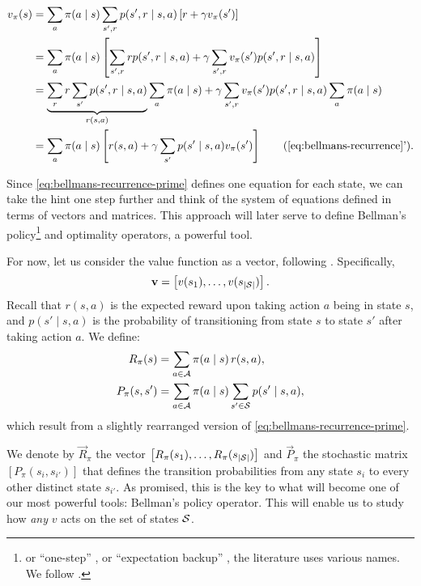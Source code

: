 \begin{align}
\label{eq:bellmans-recurrence-prime}
v_\pi(s) &= \sum_{a} \pi(a \mid s) \sum_{s', r} p(s', r \mid s, a) \left[ r + \gamma v_\pi (s') \right] \nonumber \\
&= \sum_{a} \pi(a \mid s) \left[ \sum_{s', r} r p(s', r \mid s, a) + \gamma \sum_{s', r} v_\pi (s') p(s', r \mid s,a) \right] \nonumber \\
&= \underbrace{\sum_{r} r \sum_{s'} p(s', r \mid s, a)}_{r(s,a)} \sum_a \pi(a \mid s) + \gamma \sum_{s', r} v_\pi (s') p(s', r \mid s, a) \sum_{a} \pi(a \mid s) \nonumber \\
&= \sum_{a} \pi(a \mid s) \left[ r(s,a) + \gamma \sum_{s'} p(s' \mid s, a) v_\pi (s') \right] \tag{\ref{eq:bellmans-recurrence}'}.
\end{align}

Since \eqref{eq:bellmans-recurrence-prime} defines one equation for each state,
we can take the hint one step further and think of the system of equations
defined in terms of vectors and matrices. This approach will later serve to
define Bellman's policy\footnote{or ``one-step'' \cite[pg.~9]{nadeemward2021},
or ``expectation backup'' \cite[Lect.~3, Contraction Mapping]{silver2015}, the
literature uses various names. We follow
\cite{rao2022}.} and optimality operators, a powerful tool.

For now, let us consider the value function as a vector, following
\cite[pg.~132]{raoRL4F}. Specifically,
\begin{equation*}
    \mathbf{v} = \left[ v (s_1), \dots , v (s_{|\mathcal{S}|}) \right].
\end{equation*}
Recall that $r(s, a)$ is the expected reward upon taking action $a$ being in
state $s$, and $p(s' \mid s, a)$ is the probability of transitioning from state
$s$ to state $s'$ after taking action $a$. We define:
\begin{align*}
    R_\pi (s) &= \sum_{a \in \mathcal{A}} \pi(a \mid s) \, r(s,a), \\
    P_\pi (s, s') &= \sum_{a \in \mathcal{A}} \pi(a \mid s) \sum_{s' \in \mathcal{S}} p(s' \mid s, a),
\end{align*}
which result from a slightly rearranged version of
\eqref{eq:bellmans-recurrence-prime}.

We denote by $\vec{R}_\pi$ the vector $\left[ R_\pi(s_1), \dots, R_\pi
(s_{|\mathcal{S}|}) \right]$ and $\vec{P}_\pi$ the stochastic matrix $\left[
P_\pi(s_i, s_{i'}) \right]$ that defines the transition probabilities from any
state $s_i$ to every other distinct state $s_{i'}$. As promised, this is the key
to what will become one of our most powerful tools: Bellman's policy operator.
This will enable us to study how \textit{any} $v$ acts on the set of states
$\mathcal{S}$.


